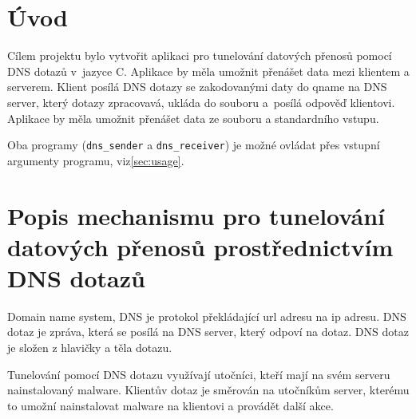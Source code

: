 \section{Úvod}
\label{sec:uvod}
Cílem projektu bylo vytvořit aplikaci pro tunelování datových přenosů pomocí
DNS dotazů v~jazyce C\@. Aplikace by měla umožnit přenášet data mezi klientem
a serverem.
Klient posílá DNS dotazy se zakodovanými daty do qname na DNS server,
který dotazy zpracovavá, ukláda do souboru a~posílá odpověď klientovi.
Aplikace by měla umožnit přenášet data ze souboru a standardního vstupu.

Oba programy (\texttt{dns\_sender} a \texttt{dns\_receiver}) je možné
ovládat přes vstupní argumenty programu, viz\ref{sec:usage}.



\section{Popis mechanismu pro tunelování datových přenosů prostřednictvím DNS dotazů}
\label{sec:popis-mechanismu-pro-tunelovani-datovych-prenosu-prostrednictvim-dns-dotazu}

Domain name system, DNS je protokol překládající url adresu na ip adresu.
DNS dotaz je zpráva, která se posílá na DNS server, který odpoví na dotaz.
DNS dotaz je složen z hlavičky a těla dotazu.

Tunelování pomocí DNS dotazu využívají utočníci, kteří
mají na svém serveru nainstalovaný malware.
Klientův dotaz je směrován na utočníkům server, kterému to umožní
nainstalovat malware na klientovi a provádět další akce.
